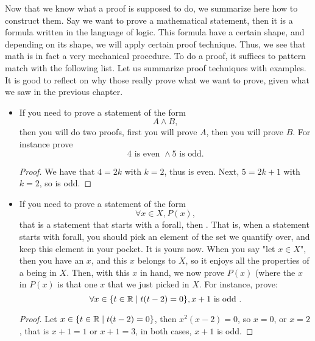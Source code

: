 Now that we know what a proof is supposed to do, we summarize here how to construct them. Say we want to prove a mathematical statement, then it is a formula written in the language of logic. This formula have a certain shape, and depending on its shape, we will apply certain proof technique. Thus, we see that math is in fact a very mechanical procedure. To do a proof, it suffices to pattern match with the following list. Let us summarize proof techniques with examples. It is good to reflect on why those really prove what we want to prove, given what we saw in the previous chapter.
\begin{itemize}
    \item If you need to prove a statement of the form
        \begin{equation*}
           A \land B,
        \end{equation*}
        then you will do two proofs, first you will prove \( A \), then you will prove \( B \). For instance prove
        \begin{equation*}
            4 \text{ is even } \land 5 \text{ is odd}.
        \end{equation*}
        \begin{proof}
            We have that \( 4 = 2 k \) with \( k = 2 \), thus is even. Next, \( 5 = 2k + 1 \) with \( k = 2 \), so is odd.
        \end{proof}

    \item If you need to prove a statement of the form
        \begin{equation*}
            \forall x \in X, P(x),
        \end{equation*}
        that is a statement that starts with a forall, then . That is, when a statement starts with forall, you should pick an element of the set we quantify over, and keep this element in your pocket. It is yours now. When you say "let \( x \in X \)", then you have an \( x \), and this \( x \) belongs to \( X \), so it enjoys all the properties of a being in \( X \). Then, with this \( x \) in hand, we now prove \( P(x) \) (where the \( x \) in \( P(x) \) is that one \( x \) that we just picked in \( X \). For instance, prove:
        \begin{equation*}
            \forall x \in \{ t \in \mathbb{R} \mid t(t - 2) = 0\}, x + 1 \text{ is odd }. 
        \end{equation*}
        \begin{proof}
            Let \( x \in \{ t \in \mathbb{R} \mid t(t - 2) = 0\} \), then \( x^2(x - 2) = 0 \), so \( x = 0 \), or \( x = 2 \), that is \( x + 1 = 1 \) or \( x + 1 = 3 \), in both cases, \( x + 1 \) is odd.
        \end{proof}


\end{itemize}
